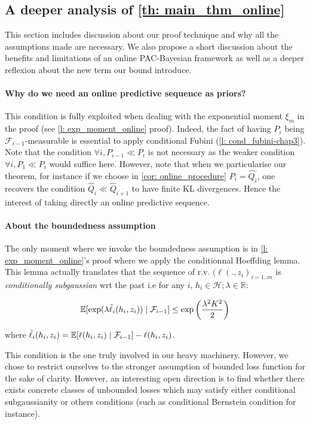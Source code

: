 \begin{noaddcontents}
\subsection{A deeper analysis of \cref{th: main_thm_online}}
\label{sec: deeper_analysis_main_thm}

This section includes discussion about our proof technique and why all the assumptions made are necessary. We also propose a short discussion about the benefits and limitations of an online PAC-Bayesian framework as well as a deeper reflexion about the new term our bound introduce.


\paragraph{Why do we need an online predictive sequence as priors? }

This condition is fully exploited when dealing with the exponential moment $\xi_m$ in the proof (see \cref{l: exp_moment_online} proof). Indeed, the fact of having $P_i$ being $\mathcal{F}_{i-1}$-measurable is essential to apply conditional Fubini (\cref{l: cond_fubini-chap3}). Note that the condition $\forall i , P_{i-1}\ll P_{i}$ is not necessary as the weaker condition $\forall i, P_1 \ll P_i$ would suffice here.
However, note that when we particularise our theorem, for instance if we choose in \cref{cor: online_procedure} $P_i= \hat{Q_i}$, one recovers the condition $\hat{Q}_{i}\ll\hat{Q}_{i+1}$ to have finite KL divergences. Hence the interest of taking directly an online predictive sequence.

\paragraph{About the boundedness assumption}

The only moment where we invoke the boundedness assumption is in \cref{l: exp_moment_online}'s proof where we apply the conditionnal Hoeffding lemma. This lemma actually translates that the sequence of r.v. $(\ell(.,z_i)_{i=1..m}$ is \emph{conditionally subgaussian} wrt the past i.e for any $i$, $h_i\in\mathcal{H}; \lambda\in\mathbb{R}$:

\[ \mathbb{E}[\exp(\lambda \Tilde{\ell}_i(h_i,z_i)) \mid \mathcal{F}_{i-1}] \leq \exp\left( \frac{\lambda^2K^2}{2}\right)\]

 where $\Tilde{\ell}_i(h_i,z_i)= \mathbb{E}[\ell(h_i,z_i)\mid \mathcal{F}_{i-1}]-  \ell(h_i,z_i)$.

 This condition is the one truly involved in our heavy machinery. However, we chose to restrict ourselves to the stronger assumption of bounded loss function for the sake of clarity. However, an interesting open direction is to find whether there exists concrete classes of unbounded losses which may satisfy either conditional subgaussianity or others conditions (such as conditional Bernstein condition for instance).



\end{noaddcontents}

